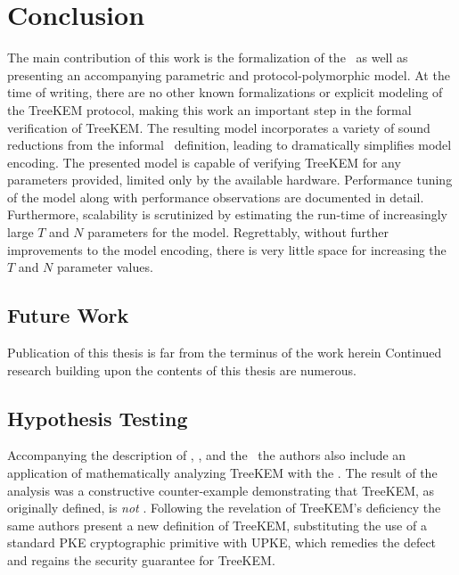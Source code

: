 \hypertarget{sec:conclusion}{%
\chapter{Conclusion}\label{sec:conclusion}}

The main contribution of this work is the formalization of the \CGKAsec\ as well as presenting an accompanying parametric and protocol-polymorphic  model.
At the time of writing, there are no other known formalizations or explicit modeling of the TreeKEM protocol, making this work an important step in the formal verification of TreeKEM.
The resulting \CGKAmod{}{}{} model incorporates a variety of sound reductions from the informal \CGKAsec\ definition, leading to dramatically simplifies model encoding.
The presented \CGKAmod{}{}{} model is capable of verifying TreeKEM for any parameters provided, limited only by the available hardware.
Performance tuning of the model along with performance observations are documented in detail.
Furthermore, scalability is scrutinized by estimating the run-time of increasingly large \(T\) and \(N\) parameters for the \CGKAmod{}{}{} model.
Regrettably, without further improvements to the model encoding, there is very little space for increasing the \(T\) and \(N\) parameter values.

\hypertarget{sec:future-work}{%
\section{Future Work}\label{sec:future-work}}

Publication of this thesis is far from the terminus of the work herein
Continued research building upon the contents of this thesis are numerous.


\hypertarget{sec:hypothesis-outcomes}{%
\section{Hypothesis Testing}\label{sec:hypothesis-outcomes}}

Accompanying the description of , \CGKAdef, and the \CGKAsec\ the authors also include an application of mathematically analyzing TreeKEM with the \CGKAsec.
The result of the analysis was a constructive counter-example demonstrating that TreeKEM, as originally defined, is \emph{not} .
Following the revelation of TreeKEM's deficiency the same authors present a new definition of TreeKEM, substituting the use of a standard PKE cryptographic primitive with UPKE, which remedies the defect and regains the  security guarantee for TreeKEM.\@

